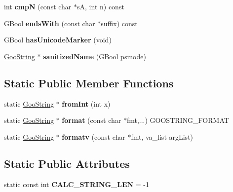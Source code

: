 \begin{DoxyCompactItemize}
int {\bfseries cmpN} (const char $\ast$sA, int n) const
\item 
\mbox{\label{class_goo_string_a28ada659740d9fb4d74d91753151c765}} 
G\+Bool {\bfseries ends\+With} (const char $\ast$suffix) const
\item 
\mbox{\label{class_goo_string_a44c0c92ce870ccc5909e887abc81a73c}} 
G\+Bool {\bfseries has\+Unicode\+Marker} (void)
\item 
\mbox{\label{class_goo_string_afabaf5c52cd1d3475c16b125847d0099}} 
\hyperlink{class_goo_string}{Goo\+String} $\ast$ {\bfseries sanitized\+Name} (G\+Bool psmode)
\end{DoxyCompactItemize}
\subsection*{Static Public Member Functions}
\begin{DoxyCompactItemize}
\item 
\mbox{\label{class_goo_string_ab7042b87620bbdda0dd7ac8a42c54dba}} 
static \hyperlink{class_goo_string}{Goo\+String} $\ast$ {\bfseries from\+Int} (int x)
\item 
\mbox{\label{class_goo_string_aa9c6ea4167d49e65359f8188795fa08f}} 
static \hyperlink{class_goo_string}{Goo\+String} $\ast$ {\bfseries format} (const char $\ast$fmt,...) G\+O\+O\+S\+T\+R\+I\+N\+G\+\_\+\+F\+O\+R\+M\+AT
\item 
\mbox{\label{class_goo_string_a1924880dace6a95e66104d95f13ac73b}} 
static \hyperlink{class_goo_string}{Goo\+String} $\ast$ {\bfseries formatv} (const char $\ast$fmt, va\+\_\+list arg\+List)
\end{DoxyCompactItemize}
\subsection*{Static Public Attributes}
\begin{DoxyCompactItemize}
\item 
\mbox{\label{class_goo_string_ae918d0ea5627518dd2a3415736542d43}} 
static const int {\bfseries C\+A\+L\+C\+\_\+\+S\+T\+R\+I\+N\+G\+\_\+\+L\+EN} = -\/1
\end{DoxyCompactItemize}


